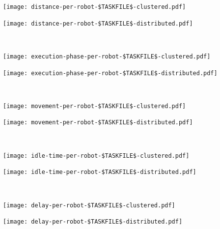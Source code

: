 \documentclass[11pt,a4paper]{article}
\begin{document}
\newpage

\noindent
\begin{minipage}{0.5\textwidth}
\texttt{[image: distance-per-robot-\$TASKFILE\$-clustered.pdf]}
\end{minipage}
\begin{minipage}{0.5\textwidth}
\texttt{[image: distance-per-robot-\$TASKFILE\$-distributed.pdf]}
\end{minipage}
\\[0.5cm]

\noindent
\begin{minipage}{0.5\textwidth}
\texttt{[image: execution-phase-per-robot-\$TASKFILE\$-clustered.pdf]}
\end{minipage}
\begin{minipage}{0.5\textwidth}
\texttt{[image: execution-phase-per-robot-\$TASKFILE\$-distributed.pdf]}
\end{minipage}
\\[0.5cm]

\noindent
\begin{minipage}{0.5\textwidth}
\texttt{[image: movement-per-robot-\$TASKFILE\$-clustered.pdf]}
\end{minipage}
\begin{minipage}{0.5\textwidth}
\texttt{[image: movement-per-robot-\$TASKFILE\$-distributed.pdf]}
\end{minipage}
\\[0.5cm]

\noindent
\begin{minipage}{0.5\textwidth}
\texttt{[image: idle-time-per-robot-\$TASKFILE\$-clustered.pdf]}
\end{minipage}
\begin{minipage}{0.5\textwidth}
\texttt{[image: idle-time-per-robot-\$TASKFILE\$-distributed.pdf]}
\end{minipage}
\\[0.5cm]

\noindent
\begin{minipage}{0.5\textwidth}
\texttt{[image: delay-per-robot-\$TASKFILE\$-clustered.pdf]}
\end{minipage}
\begin{minipage}{0.5\textwidth}
\texttt{[image: delay-per-robot-\$TASKFILE\$-distributed.pdf]}
\end{minipage}
\\[0.5cm]
\end{document}
